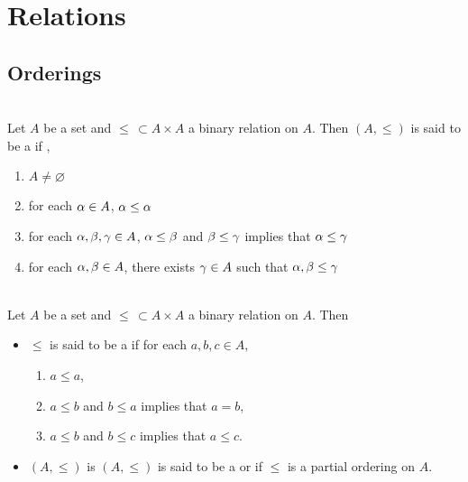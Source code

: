 \documentclass{book}
\begin{document}
	\section{Relations}
	
	
	
	\subsection{Orderings}
	
	\begin{defn}   \\
		Let $A$ be a set and $\leq \, \subset A \times A$ a binary relation on $A$. Then $(A, \leq)$ is said to be a  if , 
		\begin{enumerate}
			\item $A \neq \varnothing$
			\item for each $\alpha \in A$, $\alpha \leq \alpha$
			\item for each $\alpha, \beta, \gamma \in A$, $\alpha \leq \beta$ and $\beta \leq \gamma$ implies that $\alpha \leq \gamma$
			\item for each $\alpha, \beta \in A$, there exists $\gamma \in A$ such that $\alpha, \beta \leq \gamma$
		\end{enumerate}
	\end{defn}

	
	\begin{defn}   \\
		Let $A$ be a set and $\leq \, \subset A \times A$ a binary relation on $A$. Then 
		\begin{itemize}
			\item $\leq$ is said to be a  if for each $a,b,c \in A$,
			\begin{enumerate}
				\item $a \leq a$,
				\item $a \leq b$ and $b \leq a$ implies that $a = b$,
				\item $a \leq b$ and $b \leq c$ implies that $a \leq c$.
			\end{enumerate}
			\item $(A, \leq)$ is $(A, \leq)$ is said to be a  or  if
			$\leq$ is a partial ordering on $A$.
		\end{itemize}
	\end{defn}
	
	
	
\end{document}
